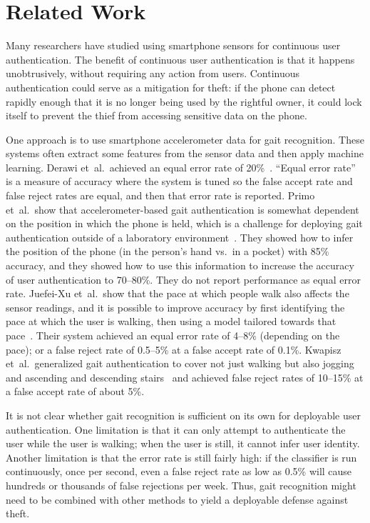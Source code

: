 \section{Related Work}

Many researchers have studied using smartphone sensors for continuous user authentication.
The benefit of continuous user authentication is that it happens unobtrusively, without requiring any action from users.
Continuous authentication could serve as a mitigation for theft: if the phone can detect rapidly enough that it is no longer being used by the rightful owner, it could lock itself to prevent the thief from accessing sensitive data on the phone.

One approach is to use smartphone accelerometer data for gait recognition.
These systems often extract some features from the sensor data and then apply machine learning.
Derawi et~al.\ achieved an equal error rate of 20\%~\cite{derawi:gait}.
``Equal error rate'' is a measure of accuracy where the system is tuned so the false accept rate and false reject rates are equal, and then that error rate is reported.
Primo et~al.\ show that accelerometer-based gait authentication is somewhat dependent on the position in which the phone is held, which is a challenge for deploying gait authentication outside of a laboratory environment~\cite{primo:context}.
They showed how to infer the position of the phone (in the person's hand vs.\ in a pocket) with 85\% accuracy, and they showed how to use this information to increase the accuracy of user authentication to 70--80\%.
They do not report performance as equal error rate.
Juefei-Xu et~al.\ show that the pace at which people walk also affects the sensor readings, and it is possible to improve accuracy by first identifying the pace at which the user is walking, then using a model tailored towards that pace~\cite{xu:pace}.
Their system achieved an equal error rate of 4--8\% (depending on the pace); or a false reject rate of 0.5--5\% at a false accept rate of 0.1\%.
Kwapisz et~al.\ generalized gait authentication to cover not just walking but also jogging and ascending and descending stairs~\cite{kwapisz:biometrics} and
achieved false reject rates of 10--15\% at a false accept rate of about 5\%.

It is not clear whether gait recognition is sufficient on its own for deployable user authentication.
One limitation is that it can only attempt to authenticate the user while the user is walking; when the user is still, it cannot infer user identity.
Another limitation is that the error rate is still fairly high: if the classifier is run continuously, once per second, even a false reject rate as low as 0.5\% will cause hundreds or thousands of false rejections per week.
Thus, gait recognition might need to be combined with other methods to yield a deployable defense against theft.

